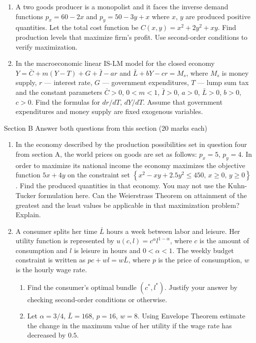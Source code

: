 \begin{enumerate}
\item A two goods producer is a monopolist and it faces the inverse demand functions $p_x=60-2x$ and $p_y=50-3y+x$ where $x$, $y$ are produced positive quantities. Let the total cost function be $C(x,y)=x^2+2y^2+xy$. Find production levels that maximize firm’s profit. Use second-order conditions to verify maximization.

\item In the macroeconomic linear IS-LM model for the closed economy
$Y=\bar{C}+m(Y-T)+G+\bar{I}-ar$ and $\bar{L}+bY-cr=M_s$, where $M_s$ is money supply, $r$ --- interest rate, $G$ --- government expenditures, $T$ --- lump sum tax and the constant parameters $\bar{C}>0$, $0<m<1$, $\bar{I}>0$, $a>0$, $\bar{L}>0$, $b>0$, $c>0$. Find the formulas for $dr/dT$, $dY/dT$. Assume that government expenditures and money supply are fixed exogenous variables.
\end{enumerate}


Section B
Answer both questions from this section (20 marks each)

\begin{enumerate}[resume]
\item In the economy described by the production possibilities set in question four from section A, the world prices on goods are set as follows: $p_x=5$, $p_y=4$. In order to maximize its national income the economy maximizes the objective function $5x+4y$ on the constraint set
$ \left\{ x^2-xy+2.5y^2\leq 450, \, x\geq 0, \, y\geq 0 \right\} $.
Find the produced quantities in that economy. You may not use the Kuhn-Tucker formulation here. Can the Weierstrass Theorem on attainment of the greatest and the least values be applicable in that maximization problem? Explain.

\item A consumer splits her time $\bar{L}$ hours a week between labor and leisure. Her utility function is represented by $u(c,l)=c^{\alpha}l^{1-\alpha}$, where $c$ is the amount of consumption and $l$ is leisure in hours and $0<\alpha<1$. The weekly budget constraint is written as $pc+wl=w\bar{L}$,
where $p$ is the price of consumption, $w$ is the hourly wage rate.
\begin{enumerate}
\item Find the consumer’s optimal bundle $(c^*,l^*)$. Justify your answer by checking second-order conditions or otherwise.
\item Let $\alpha=3/4$, $\bar{L}=168$, $p=16$, $w=8$. Using Envelope Theorem estimate the change in the maximum value of her utility if the wage rate has decreased by $0.5$.
\end{enumerate}
\end{enumerate}
